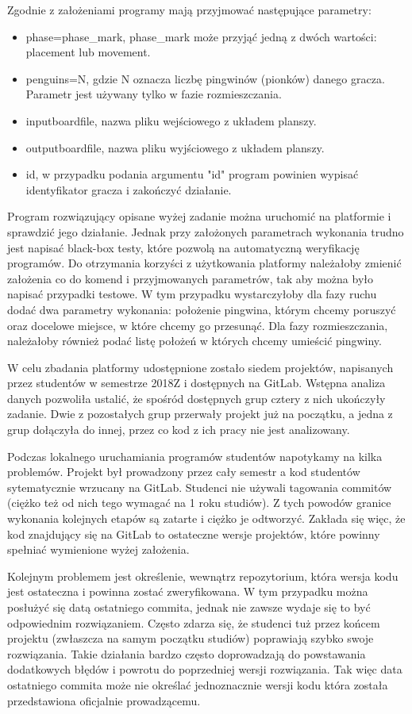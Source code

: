 Zgodnie z założeniami programy mają przyjmować następujące parametry:
\begin{itemize}
    \item phase=phase\_mark, phase\_mark może przyjąć jedną z dwóch wartości: placement lub movement.
    \item penguins=N, gdzie N oznacza liczbę pingwinów (pionków) danego gracza.
    Parametr jest używany tylko w fazie rozmieszczania.
    \item inputboardfile, nazwa pliku wejściowego z układem planszy.
    \item outputboardfile, nazwa pliku wyjściowego z układem planszy.
    \item id, w przypadku podania argumentu "id" program powinien wypisać identyfikator gracza i zakończyć działanie.
\end{itemize}

Program rozwiązujący opisane wyżej zadanie można uruchomić na platformie i sprawdzić jego działanie.
Jednak przy założonych parametrach wykonania trudno jest napisać black-box testy, które pozwolą na automatyczną weryfikację programów.
Do otrzymania korzyści z użytkowania platformy należałoby zmienić założenia co do komend i przyjmowanych parametrów, tak aby można było napisać przypadki testowe.
W tym przypadku wystarczyłoby dla fazy ruchu dodać dwa parametry wykonania: położenie pingwina, którym chcemy poruszyć oraz docelowe miejsce, w które chcemy go przesunąć.
Dla fazy rozmieszczania, należałoby również podać listę położeń w których chcemy umieścić pingwiny.

W celu zbadania platformy udostępnione zostało siedem projektów, napisanych przez studentów w semestrze 2018Z i dostępnych na GitLab.
Wstępna analiza danych pozwoliła ustalić, że spośród dostępnych grup cztery z nich ukończyły zadanie.
Dwie z pozostałych grup przerwały projekt już na początku, a jedna z grup dołączyła do innej, przez co kod z ich pracy nie jest analizowany.

Podczas lokalnego uruchamiania programów studentów napotykamy na kilka problemów.
Projekt był prowadzony przez cały semestr a kod studentów sytematycznie wrzucany na GitLab.
Studenci nie używali tagowania commitów (ciężko też od nich tego wymagać na 1 roku studiów).
Z tych powodów granice wykonania kolejnych etapów są zatarte i ciężko je odtworzyć.
Zakłada się więc, że kod znajdujący się na GitLab to ostateczne wersje projektów, które powinny spełniać wymienione wyżej założenia.

Kolejnym problemem jest określenie, wewnątrz repozytorium, która wersja kodu jest ostateczna i powinna zostać zweryfikowana.
W tym przypadku można posłużyć się datą ostatniego commita, jednak nie zawsze wydaje się to być odpowiednim rozwiązaniem.
Często zdarza się, że studenci tuż przez końcem projektu (zwłaszcza na samym początku studiów) poprawiają szybko swoje rozwiązania.
Takie działania bardzo często doprowadzają do powstawania dodatkowych błędów i powrotu do poprzedniej wersji rozwiązania.
Tak więc data ostatniego commita może nie określać jednoznacznie wersji kodu która została przedstawiona oficjalnie prowadzącemu.

